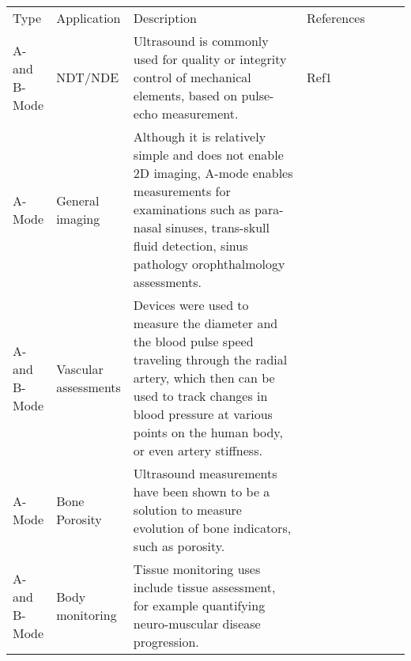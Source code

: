 
\begin{table}[]
\begin{tabular}{p{0.1\linewidth} | p{0.15\linewidth} | p{0.50\linewidth} | p{0.25\linewidth} }%
Type  & Application & Description  & References 
& \cite{zhang_fpga_2012,triger_modular_2008,assef_initial_2016,schueler_fundamentals_1984} \\

A- and B-Mode & NDT/NDE 
& Ultrasound is commonly used for quality or integrity control of mechanical elements, based on pulse-echo measurement.  
& Ref1       &  \\

A-Mode & General imaging
& Although it is relatively simple and does not enable 2D imaging, A-mode enables measurements for examinations such as para-nasal sinuses, trans-skull fluid detection, sinus pathology orophthalmology assessments. 
& \cite{noauthor_wrist_nodate,carotenuto_very_2004} &  \\  

A- and B-Mode & Vascular assessments 
& Devices were used to measure the diameter and the blood pulse speed traveling through the radial artery, which then can be used to track changes in blood pressure at various points on the human body, or even artery stiffness. 
& \cite{worthing_using_2016} \cite{hu_design_2011, zhang_multi-channel_2017, shomaji_early_2019} \cite{joseph_technical_2015, joseph_artsenstouch_2015, seo_non-invasive_2018} &  \\

A-Mode & Bone Porosity
& Ultrasound measurements have been shown to be a solution to measure evolution of bone indicators, such as porosity.
& \cite{wahab_design_2016, fontes-pereira_monitoring_2018, grasel_characterization_2017} &  \\

A- and B-Mode & Body monitoring  
& Tissue monitoring uses include tissue assessment, for example quantifying neuro-muscular disease progression.
& \cite{keyes_electrical_2017,zhang_design_2015,brausch_towards_2019}  &  \\


\end{tabular}
\end{table}
